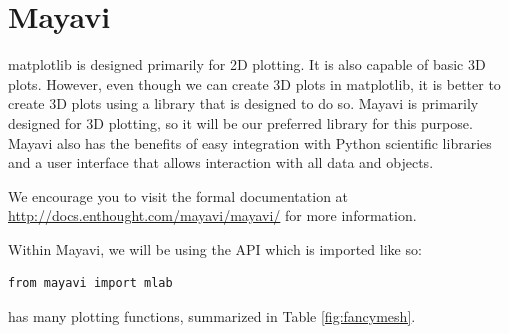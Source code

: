 \section*{Mayavi}

matplotlib is designed primarily for 2D plotting.
It is also capable of basic 3D plots.
However, even though we can create 3D plots in matplotlib, it is better to create 3D plots using a library that is designed to do so.
Mayavi is primarily designed for 3D plotting, so it will be our preferred library for this purpose.
Mayavi also has the benefits of easy integration with Python scientific libraries and a user interface that allows interaction with all data and objects.

We encourage you to visit the formal documentation at \url{http://docs.enthought.com/mayavi/mayavi/} for more information.

Within Mayavi, we will be using the  API which is imported like so:
\begin{lstlisting}
from mayavi import mlab
\end{lstlisting}

 has many plotting functions, summarized in Table \ref{fig:fancymesh}.

